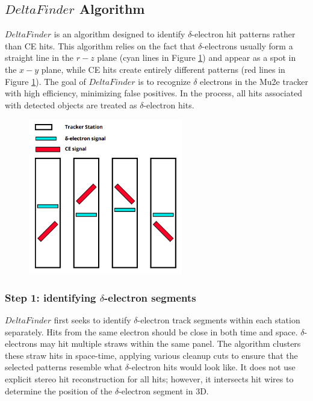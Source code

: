\subsection{$DeltaFinder$ Algorithm}
$DeltaFinder$ is an algorithm designed to 
identify $\delta$-electron hit patterns 
rather than CE hits. This algorithm relies 
on the fact that $\delta$-electrons usually 
form a straight line in the $r-z$ plane 
(cyan lines in Figure \ref{fig:yzviewdelta}) and appear 
as a spot in the $x-y$ plane, 
while CE hits create entirely different 
patterns (red lines in Figure \ref{fig:yzviewdelta}). 
The goal of $DeltaFinder$ is to recognize 
$\delta$ electrons in the Mu2e tracker 
with high efficiency, minimizing false positives. 
In the process, all hits associated with 
detected objects are treated as $\delta$-electron hits.
\begin{figure}[!h]
    \centering
    \includegraphics[width =0.6\textwidth]{figures/png/Screenshot_20240811_123048.png}
    \caption[$\delta$-electrons $y-z$ plane pattern.]{    }
    \label{fig:yzviewdelta}
\end{figure}
\subsubsection{Step 1: identifying $\delta$-electron segments}
$DeltaFinder$ first seeks to identify $\delta$-electron 
track segments within each station separately. 
Hits from the same electron should be close in both time 
and space. $\delta$-electrons may hit multiple straws 
within the same panel. The algorithm clusters these 
straw hits in space-time, applying various cleanup 
cuts to ensure that the selected patterns resemble what 
$\delta$-electron hits would look like. 
It does not use explicit stereo hit reconstruction 
for all hits; however, it intersects hit wires to determine 
the position of the $\delta$-electron segment in 3D.

